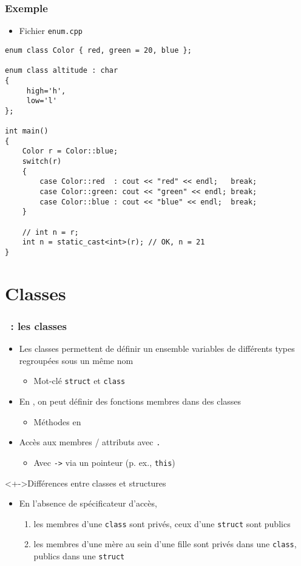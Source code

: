 \begin{frame}[containsverbatim]
\frametitle{Exemple}
\begin{itemize}
\item Fichier \texttt{enum.cpp}
\end{itemize}
\begin{lstlisting}
enum class Color { red, green = 20, blue };

enum class altitude : char
{ 
     high='h',
     low='l'
}; 

int main()
{
    Color r = Color::blue;
    switch(r)
    {
        case Color::red  : cout << "red" << endl;   break;
        case Color::green: cout << "green" << endl; break;
        case Color::blue : cout << "blue" << endl;  break;
    }
    
    // int n = r; 
    int n = static_cast<int>(r); // OK, n = 21
}
\end{lstlisting}
\end{frame}

\section{Classes}

\begin{frame}
\frametitle{\cpp\ : les classes}
\begin{itemize}[<+->]
\item Les classes permettent de définir un ensemble variables de différents types regroupées sous un même nom
	\begin{itemize}
	\item Mot-clé \lstinline|struct| et \lstinline|class|
	\end{itemize}
\item En \cpp, on peut définir des fonctions membres dans des classes
	\begin{itemize}
	\item Méthodes en \java
	\end{itemize}
\item Accès aux membres / attributs avec \texttt{.}
	\begin{itemize}
	\item Avec \texttt{->} via un pointeur (p. ex., \lstinline|this|)
	\end{itemize}
\end{itemize}
\begin{exampleblock}<+->{Différences entre classes et structures}
	\begin{itemize}[<+->]
	\item En l'absence de spécificateur d'accès,
		\begin{enumerate}
		\item les membres d'une \lstinline|class| sont privés, ceux d'une \lstinline|struct| sont publics
		\item les membres d'une mère au sein d'une fille sont privés dans une \lstinline|class|, publics dans une \lstinline|struct|
		\end{enumerate}
	\end{itemize}	
\end{exampleblock}
\end{frame}

